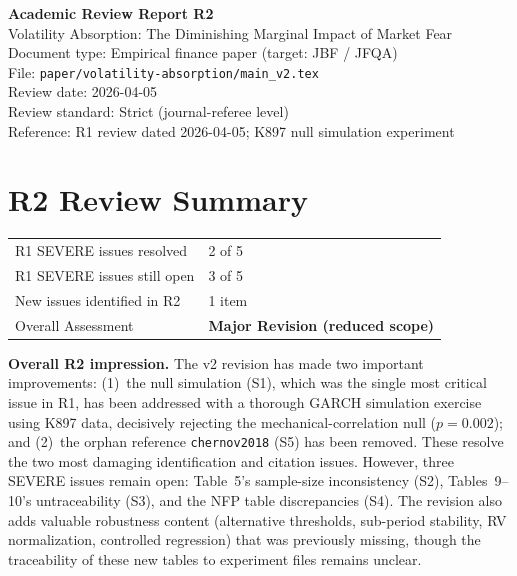 \documentclass[12pt,a4paper]{article}
\begin{document}
\begin{center}
{\Large\bfseries Academic Review Report R2}\\[0.5em]
{\large Volatility Absorption: The Diminishing Marginal Impact of Market Fear}\\[0.5em]
{\normalsize Document type: Empirical finance paper (target: JBF / JFQA)}\\
{\normalsize File: \texttt{paper/volatility-absorption/main\_v2.tex}}\\
{\normalsize Review date: 2026-04-05}\\
{\normalsize Review standard: Strict (journal-referee level)}\\
{\normalsize Reference: R1 review dated 2026-04-05; K897 null simulation experiment}
\end{center}

\bigskip

\section*{R2 Review Summary}

\begin{tabular}{ll}
\textcolor{okgreen}{R1 SEVERE issues resolved} & 2 of 5 \\
\textcolor{errorred}{R1 SEVERE issues still open} & 3 of 5 \\
\textcolor{warncolor}{New issues identified in R2} & 1 item \\
Overall Assessment & \textbf{Major Revision (reduced scope)} \\
\end{tabular}

\medskip

\noindent\textbf{Overall R2 impression.} The v2 revision has made two important improvements: (1)~the null simulation (S1), which was the single most critical issue in R1, has been addressed with a thorough GARCH simulation exercise using K897 data, decisively rejecting the mechanical-correlation null ($p = 0.002$); and (2)~the orphan reference \texttt{chernov2018} (S5) has been removed. These resolve the two most damaging identification and citation issues. However, three SEVERE issues remain open: Table~5's sample-size inconsistency (S2), Tables~9--10's untraceability (S3), and the NFP table discrepancies (S4). The revision also adds valuable robustness content (alternative thresholds, sub-period stability, RV normalization, controlled regression) that was previously missing, though the traceability of these new tables to experiment files remains unclear.
\end{document}
